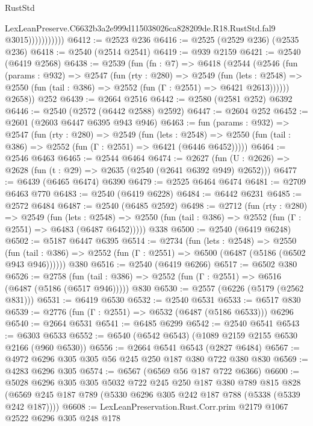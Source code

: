 \begin{lexlean}{RustStd}
\begin{coremodule}
                          LexLeanPreserve.C6632b3a2e999d115038026ca828209de.R18.RustStd.fal9
                          @3015)))))))))))
@6412 := @2523 @236
@6416 := @2525 (@2529 @236) (@2535 @236)
@6418 := @2540 (@2514 @2541)
@6419 := @939 @2159
@6421 := @2540 (@6419 @2568)
@6438 := @2539
    (fun (fn : @7) =>
    @6418
      (@2544
        (@2546
          (fun (params : @932) =>
          @2547
            (fun (rty : @280) =>
            @2549
              (fun (lets : @2548) =>
              @2550 (fun (tail : @386) => @2552 (fun (Γ : @2551) => @6421 @2613))))))
        @2658))
    @252
@6439 := @2664 @2516
@6442 := @2580 (@2581 @252) @6392
@6446 := @2540 (@2572 (@6442 @2588) @2592)
@6447 := @2604 @252
@6452 := @2601 (@2603 @6447 @6395 @943 @946)
@6463 := fun (params : @932) =>
  @2547
    (fun (rty : @280) =>
    @2549
      (fun (lets : @2548) =>
      @2550 (fun (tail : @386) => @2552 (fun (Γ : @2551) => @6421 (@6446 @6452)))))
@6464 := @2546 @6463
@6465 := @2544 @6464
@6474 := @2627 (fun (U : @2626) => @2628 (fun (t : @29) => @2635 (@2540 (@2641 @6392 @949) @2652)))
@6477 := @6439 (@6465 @6474) @6390
@6479 := @2525 @6464 @6474
@6481 := @2709 @6463 @770
@6483 := @2540 (@6419 @6228)
@6484 := @6442 @6231
@6485 := @2572 @6484
@6487 := @2540 (@6485 @2592)
@6498 := @2712
    (fun (rty : @280) =>
    @2549
      (fun (lets : @2548) =>
      @2550 (fun (tail : @386) => @2552 (fun (Γ : @2551) => @6483 (@6487 @6452)))))
    @338
@6500 := @2540 (@6419 @6248)
@6502 := @5187 @6447 @6395
@6514 := @2734
    (fun (lets : @2548) =>
    @2550 (fun (tail : @386) => @2552 (fun (Γ : @2551) => @6500 (@6487 (@5186 (@6502 @943 @946))))))
    @380
@6516 := @2540 (@6419 @6266)
@6517 := @6502 @380
@6526 := @2758
    (fun (tail : @386) => @2552 (fun (Γ : @2551) => @6516 (@6487 (@5186 (@6517 @946)))))
    @830
@6530 := @2557 (@6226 (@5179 (@2562 @831)))
@6531 := @6419 @6530
@6532 := @2540 @6531
@6533 := @6517 @830
@6539 := @2776 (fun (Γ : @2551) => @6532 (@6487 (@5186 @6533))) @6296
@6540 := @2664 @6531
@6541 := @6485 @6299
@6542 := @2540 @6541
@6543 := @6303 @6533
@6552 := @6540 (@6542 @6543) (@1089 @2159 @2155 @6530 @2166 (@960 @6530))
@6556 := @2664 @6541 @6543 (@2827 @6484)
@6567 := @4972 @6296 @305 @305 @56 @245 @250 @187 @380 @722 @380 @830
@6569 := @4283 @6296 @305
@6574 := @6567 (@6569 @56 @187 @722 @6366)
@6600 := @5028
    @6296
    @305
    @305
    @5032
    @722
    @245
    @250
    @187
    @380
    @789
    @815
    @828
    (@6569 @245 @187 @789 (@5330 @6296 @305 @242 @187 @788 (@5338 (@5339 @242 @187))))
@6608 := LexLeanPreservation.Rust.Corr.prim @2179 @1067 @2522 @6296 @305 @248 @178

\end{coremodule}
\end{lexlean}
